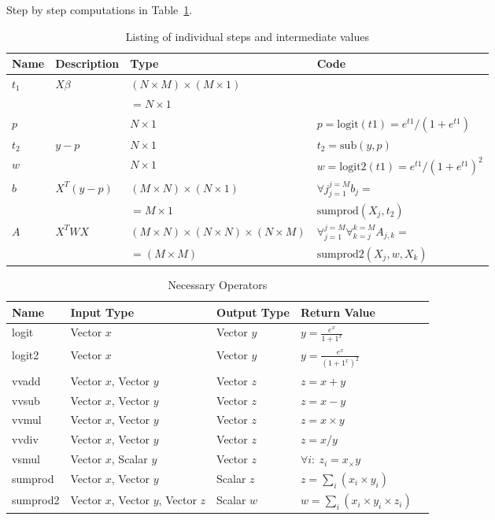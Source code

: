 \documentclass[12pt,timesnewroman,letterpaper]{article}
\begin{document}
Step by step computations in Table~\ref{step_by_step_calc}.
\begin{table}[ht]
\centering
\begin{tabular}{|l|l|l|l|} \hline \hline
  {\bf Name} & {\bf Description} & {\bf Type} & {\bf Code} \\ \hline \hline
  \(t_1\) & \(X \beta\) & \((N \times M) \times (M \times 1)\)  &  \\
  & & \(= N \times 1\) & \\ \hline
  \(p\) & & \(N \times 1\) & \( p = \mathrm{logit}(t1) = e^{t1}/(1 + e^{t1})\) \\ \hline
  \(t_2\) &  \(y - p\) & \(N \times 1\) & \( t_2 = \mathrm{sub}(y, p)\) \\ \hline
  \(w\) & & \(N \times 1\) & \( w = \mathrm{logit2}(t1) = e^{t1}/(1 + e^{t1})^2\) \\ \hline
  \(b\) & \(X^T (y-p)\) & \((M\times N) \times (N \times 1)\)
  & \(\forall j_{j=1}^{j=M} b_j = \) \\ 
        & & \( = M \times 1 \) & \(\mathrm{sumprod}(X_j, t_2)\) \\ \hline
  \(A\) & \(X^T W X\) & \((M \times N) \times (N \times N) \times (N \times M)\)
  & \(\forall_{j=1}^{j=M} \forall_{k=j}^{k=M} A_{j, k} = \) \\ 
  & & \(= (M \times M)\) & \(\mathrm{sumprod2}(X_j, w, X_k)\) \\ \hline
  \hline

\hline
\end{tabular}
\caption{Listing of individual steps and intermediate values}
\label{step_by_step_calc}
\end{table}

\begin{table}[hb]
\centering
\begin{tabular}{|l|l|l|l|l|} \hline \hline
  {\bf Name} & {\bf Input Type} & {\bf Output Type} & {\bf Return Value} \\ \hline \hline
  logit & Vector \(x\) & Vector \(y\) & \(y = \frac{e^x}{1 + 1^x}\) \\ \hline
  logit2 & Vector \(x\) & Vector \(y\) & \(y = \frac{e^x}{(1 + 1^x)^2}\) \\ \hline
  vvadd & Vector \(x\), Vector \(y\) & Vector \(z\) & \(z = x + y \)  \\ \hline
  vvsub & Vector \(x\), Vector \(y\) & Vector \(z\) & \(z = x - y \)  \\ \hline
  vvmul & Vector \(x\), Vector \(y\) & Vector \(z\) & \(z = x \times y \)  \\ \hline
  vvdiv & Vector \(x\), Vector \(y\) & Vector \(z\) & \(z = x / y \)  \\ \hline
  vsmul & Vector \(x\), Scalar \(y\) & Vector \(z\) & \(\forall i:~z_i = x_ \times y \)  \\ \hline
  sumprod & Vector \(x\), Vector \(y\) & Scalar \(z\) & \(z = \sum_i (x_i \times y_i)\) \\ \hline
  sumprod2 & Vector \(x\), Vector \(y\), Vector \(z\) & Scalar \(w\) &  \(w = \sum_i (x_i \times y_i \times z_i)\) \\ \hline
\hline
\end{tabular}
\caption{Necessary Operators}
\label{tbl_custom_ops}
\end{table}
\end{document}
